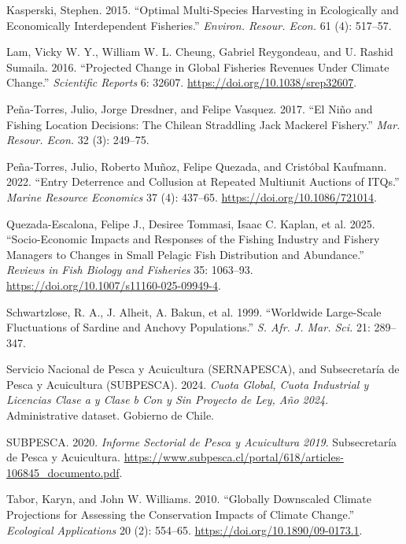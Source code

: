 \documentclass[
  11pt,
]{article}
\newlength{\cslhangindent}
\newenvironment{CSLReferences}[2] %
 {\begin{list}{}{%
  \setlength{\itemindent}{0pt}
  \setlength{\leftmargin}{0pt}
  \setlength{\parsep}{0pt}
  \ifodd #1
   \setlength{\leftmargin}{\cslhangindent}
   \setlength{\itemindent}{-1\cslhangindent}
  \fi
  \setlength{\itemsep}{#2\baselineskip}}}
 {\end{list}}
\begin{document}
\begin{CSLReferences}{1}{1}
Kasperski, Stephen. 2015. {``Optimal Multi-Species Harvesting in Ecologically and Economically Interdependent Fisheries.''} \emph{Environ. Resour. Econ.} 61 (4): 517--57.

Lam, Vicky W. Y., William W. L. Cheung, Gabriel Reygondeau, and U. Rashid Sumaila. 2016. {``Projected Change in Global Fisheries Revenues Under Climate Change.''} \emph{Scientific Reports} 6: 32607. \url{https://doi.org/10.1038/srep32607}.

Peña-Torres, Julio, Jorge Dresdner, and Felipe Vasquez. 2017. {``El Niño and Fishing Location Decisions: The Chilean Straddling Jack Mackerel Fishery.''} \emph{Mar. Resour. Econ.} 32 (3): 249--75.

Peña-Torres, Julio, Roberto Muñoz, Felipe Quezada, and Cristóbal Kaufmann. 2022. {``Entry Deterrence and Collusion at Repeated Multiunit Auctions of ITQs.''} \emph{Marine Resource Economics} 37 (4): 437--65. \url{https://doi.org/10.1086/721014}.

Quezada-Escalona, Felipe J., Desiree Tommasi, Isaac C. Kaplan, et al. 2025. {``Socio-Economic Impacts and Responses of the Fishing Industry and Fishery Managers to Changes in Small Pelagic Fish Distribution and Abundance.''} \emph{Reviews in Fish Biology and Fisheries} 35: 1063--93. \url{https://doi.org/10.1007/s11160-025-09949-4}.

Schwartzlose, R. A., J. Alheit, A. Bakun, et al. 1999. {``Worldwide Large-Scale Fluctuations of Sardine and Anchovy Populations.''} \emph{S. Afr. J. Mar. Sci.} 21: 289--347.

Servicio Nacional de Pesca y Acuicultura (SERNAPESCA), and Subsecretaría de Pesca y Acuicultura (SUBPESCA). 2024. \emph{Cuota Global, Cuota Industrial y Licencias Clase a y Clase b Con y Sin Proyecto de Ley, Año 2024}. Administrative dataset. Gobierno de Chile.

SUBPESCA. 2020. \emph{Informe Sectorial de Pesca y Acuicultura 2019}. Subsecretaría de Pesca y Acuicultura. \url{https://www.subpesca.cl/portal/618/articles-106845_documento.pdf}.

Tabor, Karyn, and John W. Williams. 2010. {``Globally Downscaled Climate Projections for Assessing the Conservation Impacts of Climate Change.''} \emph{Ecological Applications} 20 (2): 554--65. \url{https://doi.org/10.1890/09-0173.1}.


\end{CSLReferences}
\end{document}
